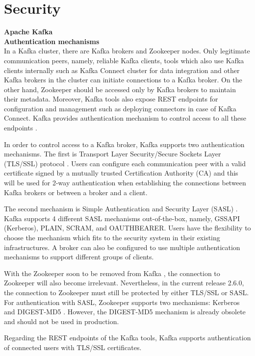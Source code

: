 \section{Security} \label{section:security}
\large \textbf{Apache Kafka}\\
\normalsize
\textbf{Authentication mechanisms}\\
In a Kafka cluster, there are Kafka brokers and Zookeeper nodes. Only legitimate communication peers, namely, reliable Kafka clients, tools which also use Kafka clients internally such as Kafka Connect cluster for data integration and other Kafka brokers in the cluster can initiate connections to a Kafka broker. On the other hand, Zookeeper should be accessed only by Kafka brokers to maintain their metadata. Moreover, Kafka tools also expose REST endpoints for configuration and management such as deploying connectors in case of Kafka Connect. Kafka provides authentication mechanism to control access to all these endpoints \cite{kafkasecurity}.

In order to control access to a Kafka broker, Kafka supports two authentication mechanisms. The first is Transport Layer  Security/Secure Sockets Layer (TLS/SSL) protocol \cite{tls}. Users can configure each communication peer with a valid certificate signed by a mutually trusted Certification Authority (CA) and this will be used for 2-way authentication when establishing the connections between Kafka brokers or between a broker and a client. 

The second mechanism is Simple Authentication and  Security Layer (SASL) \cite{sasl}. Kafka supports 4 different SASL mechanisms out-of-the-box, namely, GSSAPI (Kerberos), PLAIN, SCRAM, and OAUTHBEARER. Users have the flexibility to choose the mechanism which fits to the security system in their existing infrastructures. A broker can also be configured to use multiple authentication mechanisms to support different groups of clients. 

With the Zookeeper soon to be removed from Kafka \cite{kafkaremovezookeeper}, the connection to Zookeeper will also become irrelevant. Nevertheless, in the current release 2.6.0, the connection to Zookeeper must still be protected by either TLS/SSL or SASL. For authentication with SASL, Zookeeper supports two mechanisms: Kerberos and DIGEST-MD5 \cite{zookeepersecurity}. However, the DIGEST-MD5 mechanism is already obsolete and should not be used in production.

Regarding the REST endpoints of the Kafka tools, Kafka supports authentication of connected users with TLS/SSL certificates. 

